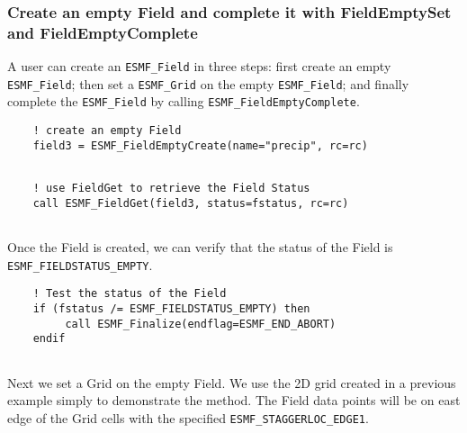 
  \subsubsection{Create an empty Field and complete it
   with FieldEmptySet and FieldEmptyComplete}
  \label{sec:field:usage:partial_creation}
  
    A user can create an {\tt ESMF\_Field} in three steps: first create an empty
    {\tt ESMF\_Field}; then set a {\tt ESMF\_Grid} on the empty {\tt ESMF\_Field};
    and finally complete the {\tt ESMF\_Field} by calling {\tt ESMF\_FieldEmptyComplete}.
   

 \begin{verbatim}
    ! create an empty Field
    field3 = ESMF_FieldEmptyCreate(name="precip", rc=rc)
 
\end{verbatim}
 

 \begin{verbatim}
    ! use FieldGet to retrieve the Field Status
    call ESMF_FieldGet(field3, status=fstatus, rc=rc)
 
\end{verbatim}
 

    Once the Field is created, we can verify that the status of the Field
    is {\tt ESMF\_FIELDSTATUS\_EMPTY}. 

 \begin{verbatim}
    ! Test the status of the Field
    if (fstatus /= ESMF_FIELDSTATUS_EMPTY) then
         call ESMF_Finalize(endflag=ESMF_END_ABORT)
    endif
 
\end{verbatim}
 

    Next we set a Grid on the empty Field. We use the 2D grid created in
    a previous example simply to demonstrate the method. The Field data points
    will be on east edge of the Grid cells with the specified
    {\tt ESMF\_STAGGERLOC\_EDGE1}. 

